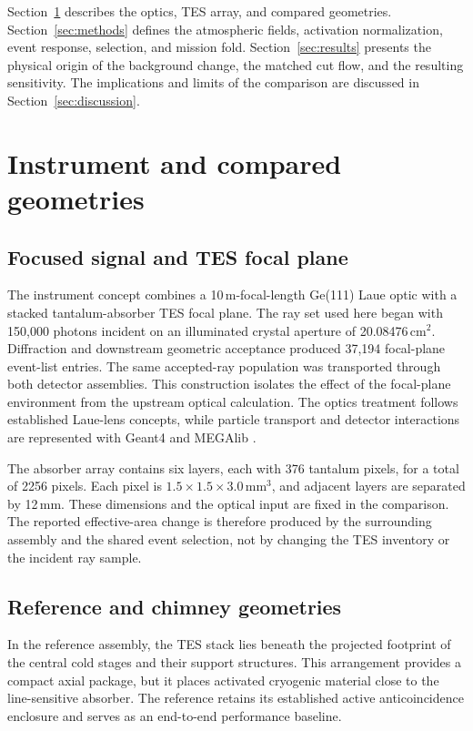 \documentclass[11pt]{article}
\begin{document}
Section~\ref{sec:instrument} describes the optics, TES array, and compared
geometries. Section~\ref{sec:methods} defines the atmospheric fields,
activation normalization, event response, selection, and mission fold.
Section~\ref{sec:results} presents the physical origin of the background
change, the matched cut flow, and the resulting sensitivity. The implications
and limits of the comparison are discussed in Section~\ref{sec:discussion}.

\section{Instrument and compared geometries}
\label{sec:instrument}

\subsection{Focused signal and TES focal plane}

The instrument concept combines a 10\,m-focal-length Ge(111) Laue optic with a
stacked tantalum-absorber TES focal plane. The ray set used here began with
150,000 photons incident on an illuminated crystal aperture of
20.08476\,cm$^2$. Diffraction and downstream geometric acceptance produced
37,194 focal-plane event-list entries. The same accepted-ray population was
transported through both detector assemblies. This construction isolates the
effect of the focal-plane environment from the upstream optical calculation.
The optics treatment follows established Laue-lens concepts, while particle
transport and detector interactions are represented with Geant4 and MEGAlib
\citep{Barriere2009,Agostinelli2003,Allison2016,Zoglauer2006}.

The absorber array contains six layers, each with 376 tantalum pixels, for a
total of 2256 pixels. Each pixel is
$1.5\times1.5\times3.0$\,mm$^3$, and adjacent layers are separated by 12\,mm.
These dimensions and the optical input are fixed in the comparison. The
reported effective-area change is therefore produced by the surrounding
assembly and the shared event selection, not by changing the TES inventory or
the incident ray sample.

\subsection{Reference and chimney geometries}
\label{sec:geometries}

In the reference assembly, the TES stack lies beneath the projected footprint
of the central cold stages and their support structures. This arrangement
provides a compact axial package, but it places activated cryogenic material
close to the line-sensitive absorber. The reference retains its established
active anticoincidence enclosure and serves as an end-to-end performance
baseline.
\end{document}
